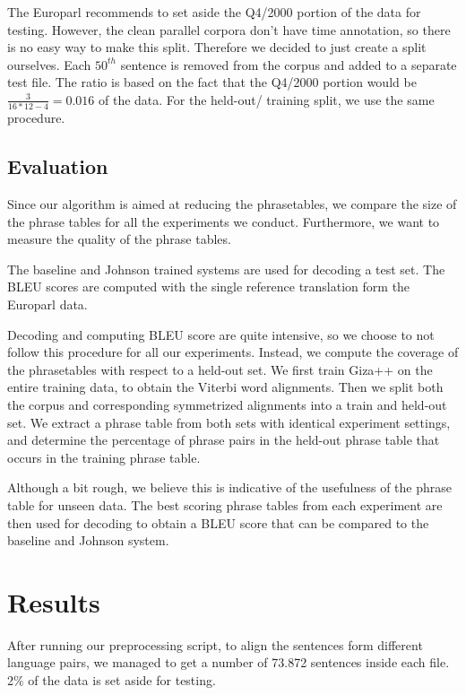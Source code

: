 \documentclass[11pt]{article}
\begin{document}
The Europarl recommends to set aside the Q4/2000 portion of the data for testing. However, the clean parallel corpora don't have time annotation, so there is no easy way to make this split. Therefore we decided to just create a split ourselves. Each $50^{th}$ sentence is removed from the corpus and added to a separate test file. The ratio is based on the fact that the Q4/2000 portion would be $\frac{3}{16*12-4}=0.016$ of the data. For the held-out/ training split, we use the same procedure.



\subsection{Evaluation}
Since our algorithm is aimed at reducing the phrasetables, we compare the size of the phrase tables for all the experiments we conduct. Furthermore, we want to measure the quality of the phrase tables.

The baseline and Johnson trained systems are used for decoding a test set. The BLEU scores are computed with the single reference translation form the Europarl data.

Decoding and computing BLEU score are quite intensive, so we choose to not follow this procedure for all our experiments. Instead, we compute the coverage of the phrasetables with respect to a held-out set. We first train Giza++ on the entire training data, to obtain the Viterbi word alignments. Then we split both the corpus and corresponding symmetrized alignments into a train and held-out set. We extract a phrase table from both sets with identical experiment settings, and determine the percentage of phrase pairs in the held-out phrase table that occurs in the training phrase table. 

Although a bit rough, we believe this is indicative of the usefulness of the phrase table for unseen data. The best scoring phrase tables from each experiment are then used for decoding to obtain a BLEU score that can be compared to the baseline and Johnson system. 



\section{Results}

After running our preprocessing script, to align the sentences form different language pairs, we managed to get a number of 73.872 sentences inside each file. 2\% of the data is set aside for testing.
\end{document}
